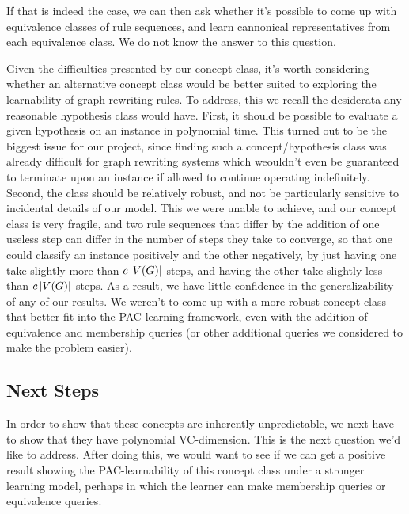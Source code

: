 \documentclass[]{article}
\begin{document}
If that is indeed the case, we can then ask whether it's possible to come up with equivalence classes of rule sequences, and learn cannonical representatives from each equivalence class. We do not know the answer to this question. 

Given the difficulties presented by our concept class, it's worth considering whether an alternative concept class would be better suited to exploring the learnability of graph rewriting rules. To address, this we recall the desiderata any reasonable hypothesis class would have. First, it should be possible to evaluate a given hypothesis on an instance in polynomial time. This turned out to be the biggest issue for our project, since finding such a concept/hypothesis class was already difficult for graph rewriting systems which weouldn't even be guaranteed to terminate upon an instance if allowed to continue operating indefinitely. Second, the class should be relatively robust, and not be particularly sensitive to incidental details of our model. This we were unable to achieve, and our concept class is very fragile, and two rule sequences that differ by the addition of one useless step can differ in the number of steps they take to converge, so that one could classify an instance positively and the other negatively, by just having one take slightly more than $c\left| V(G) \right|$ steps, and having the other take slightly less than $c\left| V(G) \right|$ steps. As a result, we have little confidence in the generalizability of any of our results. We weren't to come up with a more robust concept class that better fit into the PAC-learning framework, even with the addition of equivalence and membership queries (or other additional queries we considered to make the problem easier).

\subsection{Next Steps}

In order to show that these concepts are inherently unpredictable, we next have
to show that they have polynomial VC-dimension. This is the next question we'd
like to address. After doing this, we would want to see if we can get a positive
result showing the PAC-learnability of this concept class under a stronger
learning model, perhaps in which the learner can make membership queries or
equivalence queries.




\end{document}
